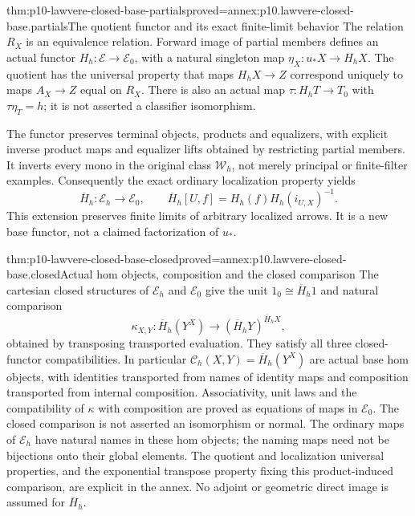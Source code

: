 \begin{hbtheorem}{thm:p10-lawvere-closed-base-partials}{proved=annex:p10.lawvere-closed-base.partials}{The quotient functor and its exact finite-limit behavior}
The relation \(R_X\) is an equivalence relation. Forward image of
partial members defines an actual functor
\(H_h:\mathcal E\to\mathcal E_0\), with a natural singleton map
\(\eta_X:u_*X\to H_hX\). The quotient has the universal property
that maps \(H_hX\to Z\) correspond uniquely to maps
\(A_X\to Z\) equal on \(R_X\).
There is also an actual map \(\tau:H_hT\to T_0\) with
\(\tau\eta_T=h\); it is not asserted a classifier isomorphism.

The functor preserves terminal objects, products and equalizers, with
explicit inverse product maps and equalizer lifts obtained by restricting
partial members. It inverts every mono in the original class
\(\mathcal W_h\), not merely principal or finite-filter examples.
Consequently the exact ordinary localization property yields
\[
 \overline H_h:\mathcal E_h\longrightarrow\mathcal E_0,
 \qquad
 \overline H_h[U,f]=H_h(f)H_h(i_{U,X})^{-1}.
\]
This extension preserves finite limits of arbitrary localized arrows.
It is a new base functor, not a claimed factorization of \(u_*\).
\end{hbtheorem}

\begin{hbtheorem}{thm:p10-lawvere-closed-base-closed}{proved=annex:p10.lawvere-closed-base.closed}{Actual hom objects, composition and the closed comparison}
The cartesian closed structures of \(\mathcal E_h\) and
\(\mathcal E_0\) give the unit
\(1_0\cong\overline H_h1\) and natural comparison
\[
 \kappa_{X,Y}:\overline H_h(Y^X)
                  \longrightarrow(\overline H_hY)^{\overline H_hX},
\]
obtained by transposing transported evaluation. They satisfy all three
closed-functor compatibilities. In particular
\(\mathcal C_h(X,Y)=\overline H_h(Y^X)\) are actual base hom
objects, with identities transported from names of identity maps and
composition transported from internal composition. Associativity, unit
laws and the compatibility of \(\kappa\) with composition are proved
as equations of maps in \(\mathcal E_0\).
The closed comparison is not asserted an isomorphism or normal. The
ordinary maps of \(\mathcal E_h\) have natural names in these hom
objects; the naming maps need not be bijections onto their global elements.
The quotient and localization universal properties, and the exponential
transpose property fixing this product-induced comparison, are explicit
in the annex. No adjoint or geometric direct image is assumed for
\(\overline H_h\).
\end{hbtheorem}

